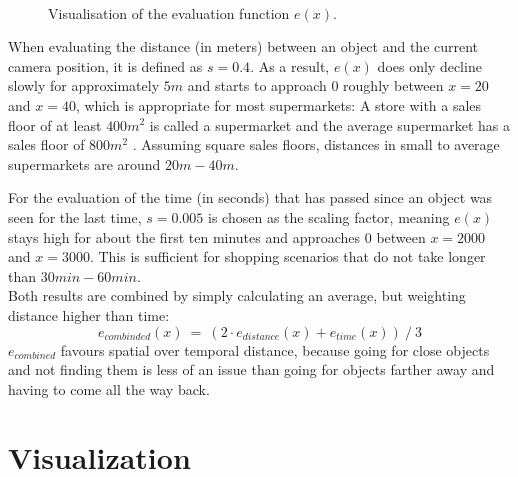 \begin{figure}[H]
  \centering
  \qquad \\[-0.5ex]
  \label{fig:evaluation}
  \caption[Object relevance evaluation function.]{Visualisation of the evaluation function $e(x)$.}
\end{figure}

When evaluating the distance (in meters) between an object and the current camera position, it is defined as $s = 0.4$. As a result, $e(x)$ does only decline slowly for approximately $5m$ and starts to approach $0$ roughly between $x = 20$ and $x = 40$, which is appropriate for most supermarkets: A store with a sales floor of at least $400m^2$ is called a supermarket and the average supermarket has a sales floor of $800m^2$ . Assuming square sales floors, distances in small to average supermarkets are around $20m - 40m$.

For the evaluation of the time (in seconds) that has passed since an object was seen for the last time, $s = 0.005$ is chosen as the scaling factor, meaning $e(x)$ stays high for about the first ten minutes and approaches $0$ between $x = 2000$ and $x = 3000$. This is sufficient for shopping scenarios that do not take longer than $30min - 60min$. \\

Both results are combined by simply calculating an average, but weighting distance higher than time:
\begin{equation*}
  e_{combinded}(x)\ =\ (2 \cdot e_{distance}(x) + e_{time}(x))\ /\ 3
\end{equation*}
$e_{combined}$ favours spatial over temporal distance, because going for close objects and not finding them is less of an issue than going for objects farther away and having to come all the way back.


\section{Visualization}
\label{sec:impl-viz}

